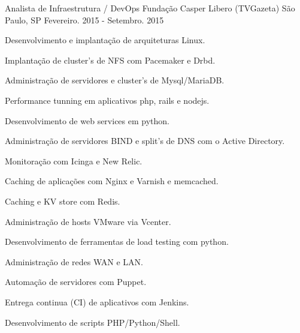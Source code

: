\begin{cventries}
  \cventry
    {Analista de Infraestrutura / DevOps} %
    {Fundação Casper Libero (TVGazeta)} %
    {São Paulo, SP} %
    {Fevereiro. 2015 - Setembro. 2015} %
    {
      \begin{cvitems} %
        \item  {Desenvolvimento e implantação de arquiteturas Linux.}
        \item  {Implantação de cluster’s de NFS com Pacemaker e Drbd.}
        \item  {Administração de servidores e cluster’s de Mysql/MariaDB.}
        \item  {Performance tunning em aplicativos php, rails e nodejs.}
        \item  {Desenvolvimento de web services em python.}
        \item  {Administração de servidores BIND e split’s de DNS com o Active Directory.}
        \item  {Monitoração com Icinga e New Relic.}
        \item  {Caching de aplicações com Nginx e Varnish e memcached.}
        \item  {Caching e KV store com Redis.}
        \item  {Administração de hosts VMware via Vcenter.}
        \item  {Desenvolvimento de ferramentas de load testing com python. }
        \item  {Administração de redes WAN e LAN.}
        \item  {Automação de servidores com Puppet.}
        \item  {Entrega continua (CI) de aplicativos com Jenkins.}
        \item  {Desenvolvimento de scripts PHP/Python/Shell.}
      \end{cvitems}
    }


\end{cventries}
